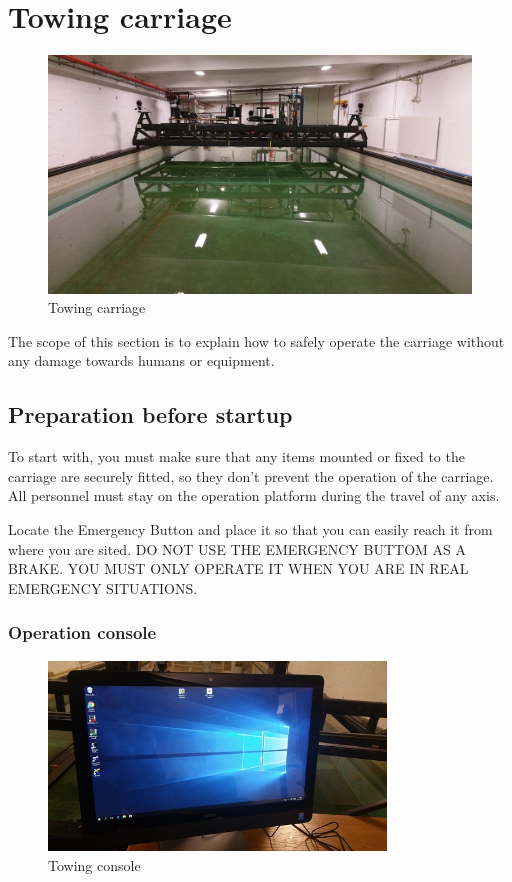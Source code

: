 \documentclass[a4paper,english]{report}
\begin{document}
\section{Towing carriage}
\begin{figure}[htb!]
	\centering \includegraphics[width=1\textwidth]{fig/towing_carriage}
	\caption{Towing carriage}
	\label{fig: Towing carriage}
\end{figure}
The scope of this section is to explain how to safely operate the carriage without any damage towards humans or equipment. 

\subsection{Preparation before startup}
To start with, you must make sure that any items mounted or fixed to the carriage are securely fitted, so they don't prevent the operation of the carriage. All personnel must stay on the operation platform during the travel of any axis.

Locate the Emergency Button and place it so that you can easily reach it from where you are sited. DO NOT USE THE EMERGENCY BUTTOM AS A BRAKE. YOU MUST ONLY OPERATE IT WHEN YOU ARE IN REAL EMERGENCY SITUATIONS.

\subsubsection*{Operation console}
\begin{figure}[htb!]
	\centering \includegraphics[width=0.8\textwidth]{fig/towing_console}
	\caption{Towing console}
	\label{fig: Towing console}
\end{figure}
\end{document}
